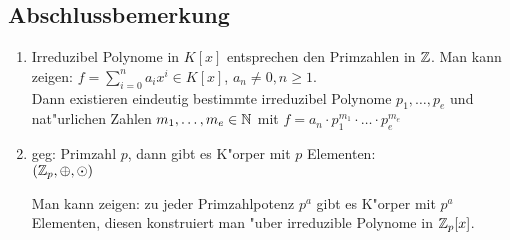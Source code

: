 \subsection{Abschlussbemerkung}
\begin{enumerate}
	\item
	Irreduzibel Polynome in $K[x]$ entsprechen den Primzahlen in $\mathbb{Z}$. Man kann zeigen:
	$f = \sum_{i=0}^{n} a_i x^i \in K[x]$, $a_n \neq 0, n \geq 1$.\\
	Dann existieren eindeutig bestimmte irreduzibel Polynome $p_1, \dots, p_e$ und nat"urlichen Zahlen $m_1, \dots , m_e \in \mathbb{N}$ mit $f= a_n \cdot p_1^{m_1} \cdot \dots \cdot p_e^{m_e}$
	\item
	geg: Primzahl $p$, dann gibt es K"orper mit $p$ Elementen:\\
	$(\mathbb{Z}_p, \oplus, \odot)$
	
	Man kann zeigen: zu jeder Primzahlpotenz $p^a$ gibt es K"orper mit $p^a$ Elementen, diesen konstruiert man "uber irreduzible Polynome in $\mathbb{Z}_p[x]$. 
\end{enumerate}